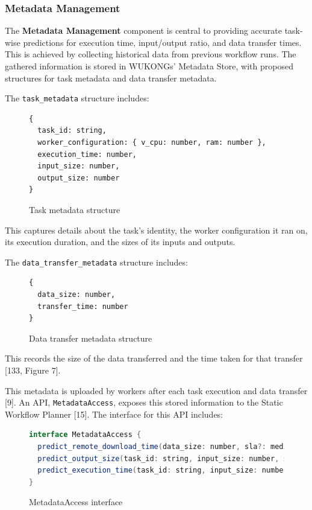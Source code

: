 \documentclass[conference]{IEEEtran}
\begin{document}
\subsubsection{Metadata Management}
The \textbf{Metadata Management} component is central to providing accurate task-wise predictions for execution time, input/output ratio, and data transfer times. This is achieved by collecting historical data from previous workflow runs. The gathered information is stored in WUKONGs' Metadata Store, with proposed structures for task metadata and data transfer metadata.

The \texttt{task\_metadata} structure includes:
\begin{figure}[h]
\centering
\begin{lstlisting}[basicstyle=\ttfamily\footnotesize, columns=fullflexible, breaklines=true]
{
  task_id: string,
  worker_configuration: { v_cpu: number, ram: number },
  execution_time: number,
  input_size: number,
  output_size: number
}
\end{lstlisting}
\caption{Task metadata structure}
\label{lst:task_metadata}
\end{figure}

This captures details about the task's identity, the worker configuration it ran on, its execution duration, and the sizes of its inputs and outputs.

The \texttt{data\_transfer\_metadata} structure includes:
\begin{figure}[h]
\centering
\begin{lstlisting}[basicstyle=\ttfamily\footnotesize, columns=fullflexible, breaklines=true]
{
  data_size: number,
  transfer_time: number
}
\end{lstlisting}
\caption{Data transfer metadata structure}
\label{lst:data_transfer_metadata}
\end{figure}

This records the size of the data transferred and the time taken for that transfer [133, Figure 7].

This metadata is uploaded by workers after each task execution and data transfer [9]. An API, \texttt{MetadataAccess}, exposes this stored information to the Static Workflow Planner [15]. The interface for this API includes:
\begin{figure}[h]
\centering
\begin{lstlisting}[language=Java, basicstyle=\ttfamily\footnotesize, columns=fullflexible, breaklines=true]
interface MetadataAccess {
  predict_remote_download_time(data_size: number, sla?: median | percentile_value | avg): number;
  predict_output_size(task_id: string, input_size: number, sla?: median | percentile_value | avg): number;
  predict_execution_time(task_id: string, input_size: number, worker_configs: List <{ worker_config: { v_cpu: number, ram: number } }>, sla?: median | percentile_value | avg): List <{ worker_config: { v_cpu: number, ram: number }, time: number }>;
}
\end{lstlisting}
\caption{MetadataAccess interface}
\label{lst:metadata_access}
\end{figure}
\end{document}
